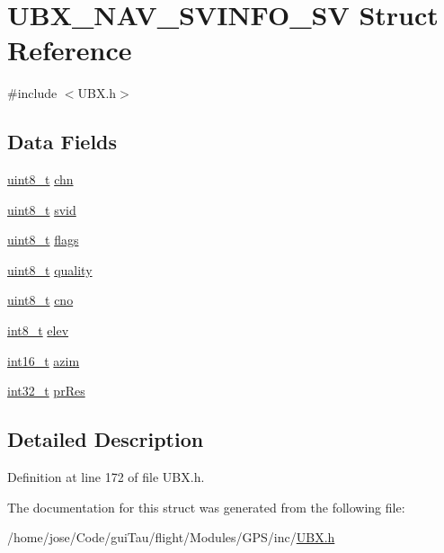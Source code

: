 \hypertarget{struct_u_b_x___n_a_v___s_v_i_n_f_o___s_v}{\section{U\-B\-X\-\_\-\-N\-A\-V\-\_\-\-S\-V\-I\-N\-F\-O\-\_\-\-S\-V Struct Reference}
\label{struct_u_b_x___n_a_v___s_v_i_n_f_o___s_v}
}


{\ttfamily \#include $<$U\-B\-X.\-h$>$}

\subsection*{Data Fields}
\begin{DoxyCompactItemize}
\item 
\hyperlink{stdint_8h_aba7bc1797add20fe3efdf37ced1182c5}{uint8\-\_\-t} \hyperlink{group___g_s_p_module_ga51b387f250ae37f8d3fa45cdd6adca45}{chn}
\item 
\hyperlink{stdint_8h_aba7bc1797add20fe3efdf37ced1182c5}{uint8\-\_\-t} \hyperlink{group___g_s_p_module_ga95b2c35d609942ecc9257b9d1c1df03d}{svid}
\item 
\hyperlink{stdint_8h_aba7bc1797add20fe3efdf37ced1182c5}{uint8\-\_\-t} \hyperlink{group___g_s_p_module_gae645c4ae01edd4d7c5dffca7eb094aa3}{flags}
\item 
\hyperlink{stdint_8h_aba7bc1797add20fe3efdf37ced1182c5}{uint8\-\_\-t} \hyperlink{group___g_s_p_module_ga3d99d4c098bc0ba52408def4080330c5}{quality}
\item 
\hyperlink{stdint_8h_aba7bc1797add20fe3efdf37ced1182c5}{uint8\-\_\-t} \hyperlink{group___g_s_p_module_ga05f735590e6c4aaa53746a4756695b09}{cno}
\item 
\hyperlink{stdint_8h_ad566f6541e98b74246db1a3a3a85ad49}{int8\-\_\-t} \hyperlink{group___g_s_p_module_ga8fad57e044674c92508262141a99a154}{elev}
\item 
\hyperlink{stdint_8h_aa343fa3b3d06292b959ffdd4c4703b06}{int16\-\_\-t} \hyperlink{group___g_s_p_module_ga74c4856a9ce3011e1de4fb51a80062dc}{azim}
\item 
\hyperlink{group___n_a_m_e_gafd12020da5a235dfcf0c3c748fb5baed}{int32\-\_\-t} \hyperlink{group___g_s_p_module_gadf2342e560319acf1b48051a49463b09}{pr\-Res}
\end{DoxyCompactItemize}


\subsection{Detailed Description}


Definition at line 172 of file U\-B\-X.\-h.



The documentation for this struct was generated from the following file\-:\begin{DoxyCompactItemize}
\item 
/home/jose/\-Code/gui\-Tau/flight/\-Modules/\-G\-P\-S/inc/\hyperlink{_u_b_x_8h}{U\-B\-X.\-h}\end{DoxyCompactItemize}
